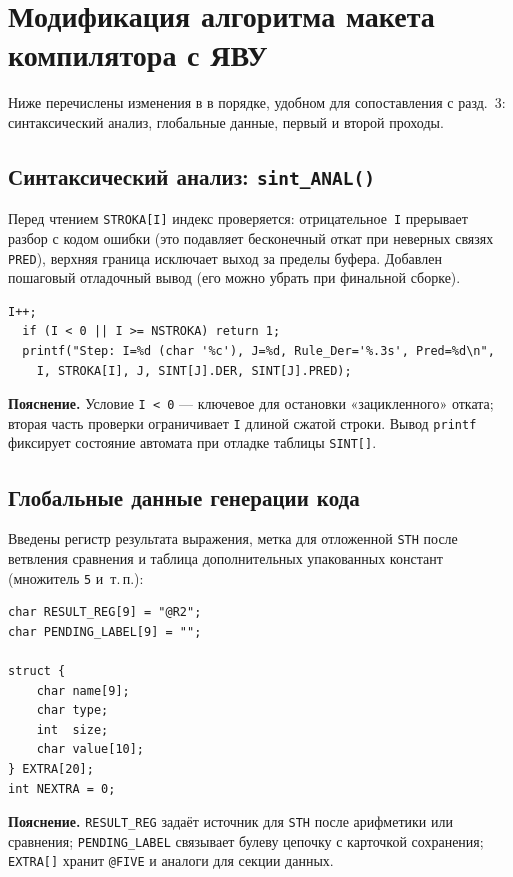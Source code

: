 \documentclass[a4paper,14pt]{extarticle}
\newcommand{\fpath}[1]{\texttt{\detokenize{#1}}}
\begin{document}
\section{Модификация алгоритма макета компилятора с ЯВУ}

Ниже перечислены изменения в \fpath{komppl.c} в порядке, удобном для сопоставления
с разд.~3: синтаксический анализ, глобальные данные, первый и второй проходы.

\subsection{Синтаксический анализ: \texttt{sint\_ANAL()}}

Перед чтением \texttt{STROKA[I]} индекс проверяется: отрицательное~\texttt{I}
прерывает разбор с кодом ошибки (это подавляет бесконечный откат при неверных
связях \texttt{PRED}), верхняя граница исключает выход за пределы буфера. Добавлен
пошаговый отладочный вывод (его можно убрать при финальной сборке).

\begin{lstlisting}[style=Cstyle,caption={Проверка индекса \texttt{I} и отладочный вывод шага разбора},label=lst:sint_anal]
  I++;
  if (I < 0 || I >= NSTROKA) return 1;
  printf("Step: I=%d (char '%c'), J=%d, Rule_Der='%.3s', Pred=%d\n", 
    I, STROKA[I], J, SINT[J].DER, SINT[J].PRED);
\end{lstlisting}
\textbf{Пояснение.} Условие \texttt{I~<~0} — ключевое для остановки «зацикленного»
отката; вторая часть проверки ограничивает \texttt{I} длиной сжатой строки.
Вывод \texttt{printf} фиксирует состояние автомата при отладке таблицы
\texttt{SINT[]}.

\subsection{Глобальные данные генерации кода}

Введены регистр результата выражения, метка для отложенной \texttt{STH} после
ветвления сравнения и таблица дополнительных упакованных констант (множитель
\texttt{5} и~т.\,п.):

\begin{lstlisting}[style=Cstyle,caption={Строки состояния между семантическими вызовами},label=lst:globals]
char RESULT_REG[9] = "@R2";
char PENDING_LABEL[9] = "";

struct {
    char name[9];
    char type;
    int  size;
    char value[10];
} EXTRA[20];
int NEXTRA = 0;
\end{lstlisting}
\textbf{Пояснение.} \texttt{RESULT\_REG} задаёт источник для \texttt{STH} после
арифметики или сравнения; \texttt{PENDING\_LABEL} связывает булеву цепочку с
карточкой сохранения; \texttt{EXTRA[]} хранит \texttt{@FIVE} и аналоги для секции
данных.
\end{document}
